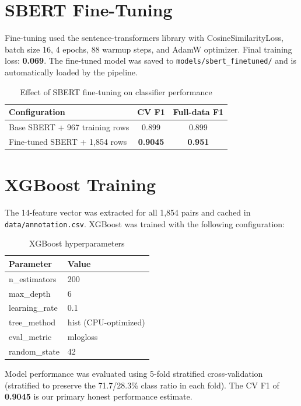\documentclass[12pt,a4paper]{report}
\begin{document}
\section{SBERT Fine-Tuning}

Fine-tuning used the sentence-transformers library with CosineSimilarityLoss, batch size 16, 4 epochs, 88 warmup steps, and AdamW optimizer. Final training loss: \textbf{0.069}. The fine-tuned model was saved to \texttt{models/sbert\_finetuned/} and is automatically loaded by the pipeline.

\begin{table}[h]
\centering
\caption{Effect of SBERT fine-tuning on classifier performance}
\begin{tabular}{lcc}
\toprule
\textbf{Configuration} & \textbf{CV F1} & \textbf{Full-data F1} \\
\midrule
Base SBERT + 967 training rows & 0.899 & 0.899 \\
Fine-tuned SBERT + 1,854 rows & \textbf{0.9045} & \textbf{0.951} \\
\bottomrule
\end{tabular}
\end{table}

\section{XGBoost Training}

The 14-feature vector was extracted for all 1,854 pairs and cached in \texttt{data/annotation.csv}. XGBoost was trained with the following configuration:

\begin{table}[h]
\centering
\caption{XGBoost hyperparameters}
\begin{tabular}{ll}
\toprule
\textbf{Parameter} & \textbf{Value} \\
\midrule
n\_estimators & 200 \\
max\_depth & 6 \\
learning\_rate & 0.1 \\
tree\_method & hist (CPU-optimized) \\
eval\_metric & mlogloss \\
random\_state & 42 \\
\bottomrule
\end{tabular}
\end{table}

Model performance was evaluated using 5-fold stratified cross-validation (stratified to preserve the 71.7/28.3\% class ratio in each fold). The CV F1 of \textbf{0.9045} is our primary honest performance estimate.
\end{document}
